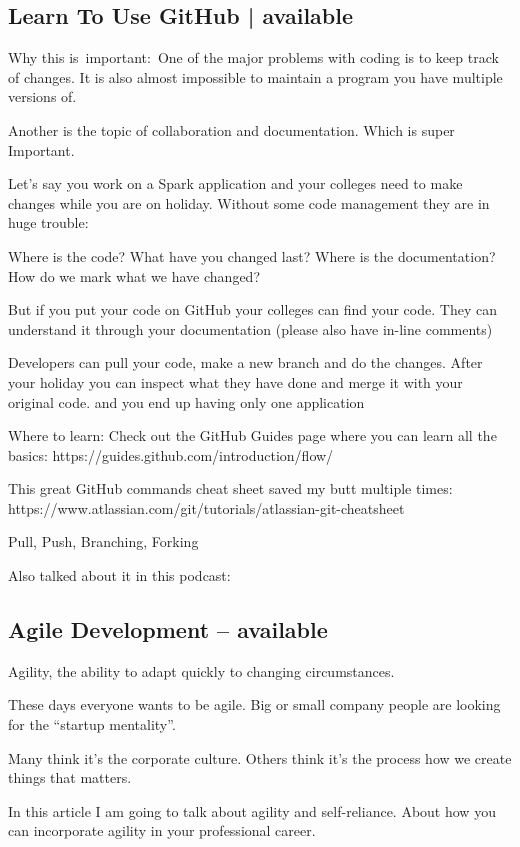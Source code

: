 \documentclass[12pt]{scrartcl} %
\begin{document}
\subsection{Learn To Use GitHub | available}
Why this is important: One of the major problems with coding is to keep track of changes. It is also almost impossible to maintain a program you have multiple versions of.

Another is the topic of collaboration and documentation. Which is super Important.

Let’s say you work on a Spark application and your colleges need to make changes while you are on holiday. Without some code management they are in huge trouble:

Where is the code? What have you changed last? Where is the documentation? How do we mark what we have changed?

But if you put your code on GitHub your colleges can find your code. They can understand it through your documentation (please also have in-line comments)

Developers can pull your code, make a new branch and do the changes. After your holiday you can inspect what they have done and merge it with your original code. and you end up having only one application

Where to learn:
Check out the GitHub Guides page where you can learn all the basics: https://guides.github.com/introduction/flow/

This great GitHub commands cheat sheet saved my butt multiple times: https://www.atlassian.com/git/tutorials/atlassian-git-cheatsheet

Pull, Push, Branching, Forking

Also talked about it in this podcast:

\subsection{Agile Development  -- available}
Agility, the ability to adapt quickly to changing circumstances.

These days everyone wants to be agile. Big or small company people are looking for the “startup mentality”.

Many think it’s the corporate culture. Others think it’s the process how we create things that matters.

In this article I am going to talk about agility and self-reliance. About how you can incorporate agility in your professional career.
\end{document}
